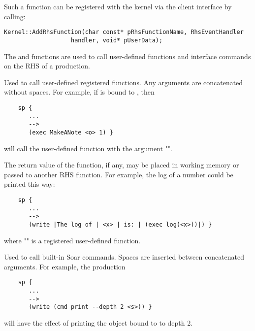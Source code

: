 Such a function can be registered with the kernel via the client interface by calling:

\begin{verbatim}
Kernel::AddRhsFunction(char const* pRhsFunctionName, RhsEventHandler 
                   handler, void* pUserData);
\end{verbatim}

The  and  functions are used to call user-defined functions and interface commands on the RHS of a production.

\begin{description}
	
\item [\soarb{exec} --- ] 
	Used to call user-defined registered functions. Any arguments are concatenated without spaces. For example, if  is bound to , then

	\begin{verbatim}
	sp {
	   ...
	   -->
	   (exec MakeANote <o> 1) }
	\end{verbatim}
	   
	will call the user-defined  function with the argument "".
	
	The return value of the function, if any, may be placed in working memory or passed to another RHS function. For example, the log of a number  could be printed this way:

	\begin{verbatim}
	sp {
	   ...
	   -->
	   (write |The log of | <x> | is: | (exec log(<x>))|) }
	\end{verbatim}
	
	where "" is a registered user-defined function.

\item[\soarb{cmd} --- ] 
	Used to call built-in Soar commands. Spaces are inserted between concatenated arguments. For example, the production

	\begin{verbatim}
	sp {
	   ...
	   -->
	   (write (cmd print --depth 2 <s>)) }
	\end{verbatim}
	
	will have the effect of printing the object bound to  to depth 2.
	
\end{description}


